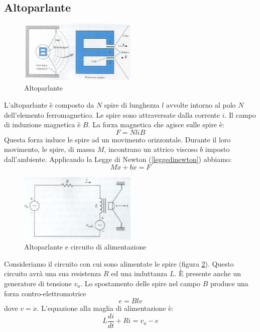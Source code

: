 \documentclass[a4paper]{report}
\begin{document}
\subsection{Altoparlante}
\begin{figure}[!h]
\centering
\includegraphics[width=0.5\textwidth]{./images/altoparlante.png}
\caption{Altoparlante\label{fig:altoparlante}}
\end{figure}
L'altoparlante \`e composto da $N$ spire di lunghezza $l$ avvolte
intorno al polo $N$ dell'elemento ferromagnetico. Le spire sono
attraversate dalla corrente $i$. Il campo di induzione magnetica \`e
$B$. La forza magnetica che agisce sulle spire \`e:
\[
  F = N l i B
\]
Questa forza induce le spire ad un movimento orizzontale. Durante il
loro movimento, le spire, di massa $M$, incontrano un attrico viscoso $b$ imposto
dall'ambiente. Applicando la Legge di Newton (\ref{leggedinewton})
abbiamo:
\begin{equation}\label{eq:amplificatore}
  M \ddot{x} + b \dot{x} = F
\end{equation}
\begin{figure}[!h]
\centering
\includegraphics[width=0.5\textwidth]{./images/altoparlante02.png}
\caption{Altoparlante e circuito di alimentazione\label{fig:altoparlante02}}
\end{figure}
Consideriamo il circuito con cui sono alimentate le spire (figura
\ref{fig:altoparlante02}). Questo circuito avr\`a una sua resistenza
$R$ ed una induttanza $L$. \`E presente anche un generatore di
tensione $v_a$. Lo spostamento delle spire nel campo $B$ produce una
forza contro-elettromotrice
\[
  e = B l v
\]
dove $v = \dot{x}$. L'equazione alla maglia di alimentazione \`e:
\begin{equation}\label{eq:Altoparlante-circuito}
  L \dfrac{di}{dt} + Ri = v_a - e
\end{equation}
\end{document}
